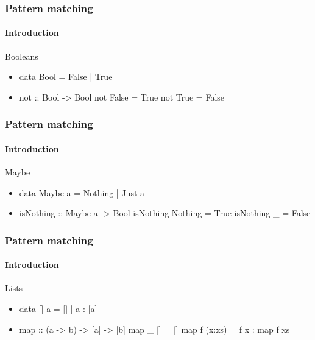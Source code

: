\documentclass{beamer}
\begin{document}

\begin{frame}[fragile]
  \frametitle{Pattern matching}
  \framesubtitle{Introduction}

  \begin{block}{Booleans}
    \begin{itemize}
    \item
      \begin{code}
data Bool = False | True
      \end{code}
    \item
      \begin{code}
not :: Bool -> Bool
not False = True
not True  = False
      \end{code}
    \end{itemize}
  \end{block}
\end{frame}

\begin{frame}[fragile]
  \frametitle{Pattern matching}
  \framesubtitle{Introduction}

  \begin{block}{Maybe}
    \begin{itemize}
    \item
      \begin{code}
data Maybe a = Nothing | Just a
      \end{code}
    \item
      \begin{code}
isNothing :: Maybe a -> Bool
isNothing Nothing = True
isNothing _       = False
      \end{code}
    \end{itemize}
  \end{block}
\end{frame}

\begin{frame}[fragile]
  \frametitle{Pattern matching}
  \framesubtitle{Introduction}

  \begin{block}{Lists}
    \begin{itemize}
    \item
      \begin{code}
data [] a = [] | a : [a]
      \end{code}
    \item
      \begin{code}
map :: (a -> b) -> [a] -> [b]
map _ []     = []
map f (x:xs) = f x : map f xs
      \end{code}
    \end{itemize}
  \end{block}
\end{frame}
\end{document}
